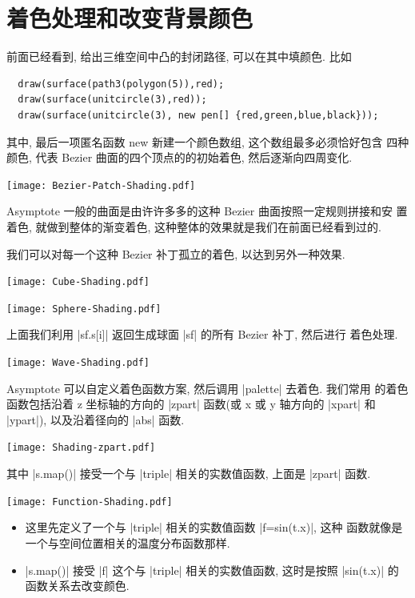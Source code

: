 \documentclass{ctexbook}
\begin{document}
\section{着色处理和改变背景颜色}
前面已经看到, 给出三维空间中凸的封闭路径, 可以在其中填颜色. 比如
\begin{lstlisting}
  draw(surface(path3(polygon(5)),red);
  draw(surface(unitcircle(3),red));
  draw(surface(unitcircle(3), new pen[] {red,green,blue,black}));
\end{lstlisting}
其中, 最后一项匿名函数 new 新建一个颜色数组, 这个数组最多必须恰好包含
四种颜色, 代表 Bezier 曲面的四个顶点的的初始着色, 然后逐渐向四周变化.
\begin{center}\texttt{[image: Bezier-Patch-Shading.pdf]}\end{center}%

Asymptote 一般的曲面是由许许多多的这种 Bezier 曲面按照一定规则拼接和安
置着色, 就做到整体的渐变着色, 这种整体的效果就是我们在前面已经看到过的.

我们可以对每一个这种 Bezier 补丁孤立的着色, 以达到另外一种效果.
\begin{center}\texttt{[image: Cube-Shading.pdf]}\end{center}%

\begin{center}\texttt{[image: Sphere-Shading.pdf]}\end{center}%

上面我们利用 |sf.s[i]| 返回生成球面 |sf| 的所有 Bezier 补丁, 然后进行
着色处理.
\begin{center}\texttt{[image: Wave-Shading.pdf]}\end{center}%


Asymptote 可以自定义着色函数方案, 然后调用 |palette| 去着色. 我们常用
的着色函数包括沿着 z 坐标轴的方向的 |zpart| 函数(或 x 或 y 轴方向的
|xpart| 和 |ypart|), 以及沿着径向的 |abs| 函数.
\begin{center}\texttt{[image: Shading-zpart.pdf]}\end{center}%

其中 |s.map()| 接受一个与 |triple| 相关的实数值函数, 上面是 |zpart| 函数.
\begin{center}\texttt{[image: Function-Shading.pdf]}\end{center}%

\begin{itemize}
\item 这里先定义了一个与 |triple| 相关的实数值函数 |f=sin(t.x)|, 这种
  函数就像是 一个与空间位置相关的温度分布函数那样.
\item  |s.map()| 接受 |f| 这个与 |triple| 相关的实数值函数, 这时是按照
  |sin(t.x)| 的函数关系去改变颜色.
\end{itemize}
\end{document}
